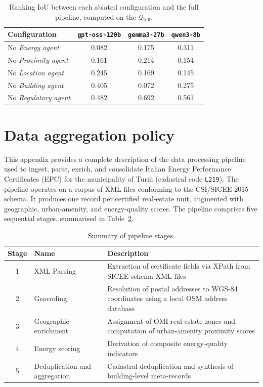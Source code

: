 \documentclass[runningheads,orivec]{llncs}
\newcommand{\locationagent}{\textit{Location agent}}
\newcommand{\energyagent}{\textit{Energy agent}}
\newcommand{\proximityagent}{\textit{Proximity agent}}
\newcommand{\regulatoryagent}{\textit{Regulatory agent}}
\newcommand{\buildingagent}{\textit{Building agent}}
\newcommand{\gptoss}{\texttt{gpt-oss-120b}}
\newcommand{\gemma}{\texttt{gemma3-27b}}
\newcommand{\qwen}{\texttt{qwen3-8b}}
\newcommand{\completequeries}{$\mathcal{Q}_\text{full}$}
\begin{document}
\begin{table}[h]
\centering
\caption{Ranking IoU between each ablated configuration and the full pipeline, computed on the \completequeries.}
\label{tab:ablation_summary}
\begin{tabular}{lccc}
\toprule
\textbf{Configuration} & \textbf{\gptoss} & \textbf{\gemma} & \textbf{\qwen} \\
\midrule
No \energyagent           & 0.082 & 0.175 & 0.311 \\
No \proximityagent        & 0.161 & 0.214 & 0.154 \\
No \locationagent         & 0.245 & 0.169 & 0.145 \\
No \buildingagent         & 0.405 & 0.072 & 0.275 \\
No \regulatoryagent       & 0.482 & 0.692 & 0.561 \\
\bottomrule
\end{tabular}
\end{table}

\section{Data aggregation policy}

This appendix provides a complete description of the data
processing pipeline used to ingest, parse, enrich, and consolidate
Italian Energy Performance Certificates (EPC) for the municipality of Turin (cadastral
code \texttt{L219}). The pipeline
operates on a corpus of XML files conforming to the CSI/SICEE 2015
schema. It produces one record
per certified real-estate unit, augmented with geographic,
urban-amenity, and energy-quality scores.
The pipeline comprises five sequential stages, summarised in
Table~\ref{tab:stages}.

\begin{table}[h]
\centering
\caption{Summary of pipeline stages.}
\label{tab:stages}
\begin{tabularx}{\textwidth}{clX}
\toprule
\textbf{Stage} & \textbf{Name} & \textbf{Description} \\
\midrule
1 & XML Parsing         & Extraction of certificate fields via XPath from SICEE-schema XML files \\
2 & Geocoding           & Resolution of postal addresses to WGS-84 coordinates using a local OSM address database \\
3 & Geographic enrichment & Assignment of OMI real-estate zones and computation of urban-amenity proximity scores \\
4 & Energy scoring      & Derivation of composite energy-quality indicators \\
5 & Deduplication and aggregation & Cadastral deduplication and synthesis of building-level meta-records \\
\bottomrule
\end{tabularx}
\end{table}
\end{document}
